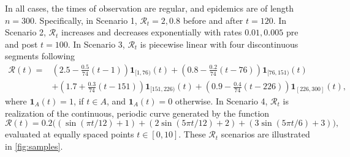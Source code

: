 \documentclass[10pt,letterpaper]{article}
\newcommand{\lr}[1]{\left(#1\right)}
\def\calR{\mathcal{R}}
\begin{document}
In all cases, the times of observation are regular, and epidemics are of
length $n=300$. Specifically, in Scenario 1, $\calR_t = 2, 0.8$ before and after
$t=120$. In Scenario 2, $\calR_t$ increases and decreases exponentially with
rates $0.01, 0.005$ pre and post $t=100$. 
In Scenario 3, $\calR_t$ is piecewise linear with four discontinuous segments following 
\begin{equation}
  \begin{split}
    \calR(t) =& \lr{2.5 - \frac{0.5}{74}\lr{t-1}} \boldsymbol{1}_{[1,76)}(t)
     + \lr{0.8 - \frac{0.2}{74}\lr{t-76}} \boldsymbol{1}_{[76,151)}(t) \\
    & + \lr{1.7 + \frac{0.3}{74}\lr{t-151}} \boldsymbol{1}_{[151,226)}(t)
       + \lr{0.9 - \frac{0.4}{74}\lr{t-226}} \boldsymbol{1}_{[226,300]}(t),
  \end{split}
\end{equation}
where $\boldsymbol{1}_{A}(t) = 1$, if $t\in A$, and $\boldsymbol{1}_{A}(t)=0$ otherwise. 
In Scenario 4, $\calR_t$ is realization of the 
continuous, periodic curve generated by the function 
\begin{equation}
  \calR(t) = 0.2 \big(\lr{\sin(\pi t/12) + 1} + \lr{2 \sin\lr{5 \pi t / 12} + 2} 
  + \lr{3 \sin(5\pi t / 6) + 3}\big),
\end{equation} 
evaluated at equally spaced points $t\in [0,10]$. 
These $\calR_t$ scenarios are illustrated in \autoref{fig:samples}.
\end{document}
